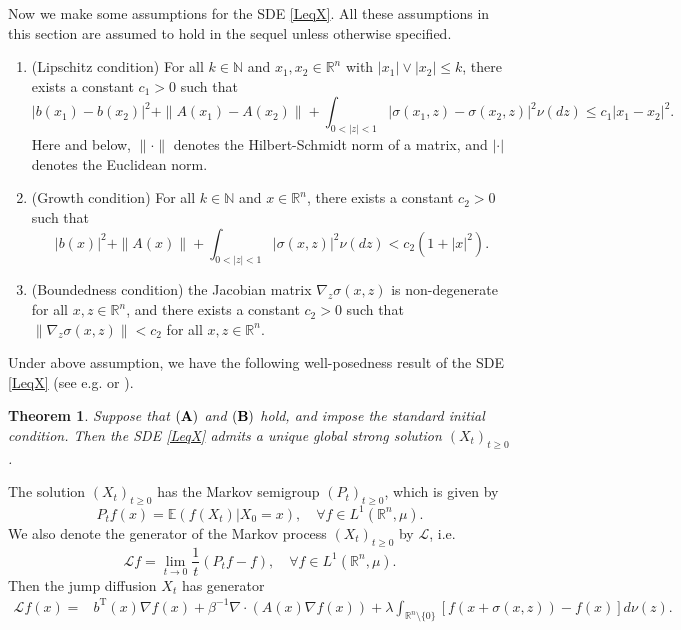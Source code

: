 \documentclass[10pt]{article}
\newtheorem{thm}{Theorem}[section]
\theoremstyle{definition}
\numberwithin{equation}{section}
\begin{document}
Now we make some assumptions for the SDE \eqref{LeqX}. All these assumptions in this section are assumed to hold in the sequel unless otherwise specified.
\begin{enumerate}
    \item[({\bf A})](Lipschitz condition) For all $k \in \mathbb{N}$ and $ x_{1}, x_{2} \in  \mathbb{R}^n$ with $|x_1| \vee |x_2| \leq k$, there exists a constant  $c_1 >0$ such that
\begin{equation*}
     |b(x_1) - b(x_2)|^2+\|A(x_1)- A(x_2)\| + \int_{0 <|z| <1} |\sigma(x_1,z) - \sigma(x_2,z)|^2 \nu (dz) \leq c_1 |x_1-x_2|^{2}.
\end{equation*}
Here and below, $\|\cdot\|$ denotes the Hilbert-Schmidt norm of a matrix, and $|\cdot|$ denotes the Euclidean norm.
    \item[({\bf B})] (Growth condition) For all $k \in \mathbb{N}$ and $ x\in  \mathbb{R}^n$, there exists a constant  $c_2 >0$ such that
\begin{equation*}
 |b(x)|^2 + \|A(x)\| + \int_{0 <|z| <1} |\sigma(x,z)|^2 \nu (dz) < c_2(1 + |x|^2).
\end{equation*}
    \item[({\bf C})] (Boundedness condition) the Jacobian matrix $\nabla_z \sigma(x,z)$ is non-degenerate for all $x,z \in \mathbb{R}^n$, and there exists a constant $c_2>0$ such that $\|\nabla_z \sigma(x,z)\| < c_2$ for all $x,z \in \mathbb{R}^n$.
\end{enumerate} 

Under above assumption, we have the following well-posedness result of the SDE \eqref{LeqX} (see e.g. \cite[Theorem 6.2.9]{A2004} or \cite[Theorem 3.3.1]{K19}).

\begin{thm}\label{ExD}
Suppose that $({\bf A})$ and $({\bf B})$ hold, and impose the standard initial condition. Then the SDE \eqref{LeqX} admits a unique global strong solution $(X_t)_{t\geq 0}$.
\end{thm}

The solution $(X_t)_{t\geq 0}$ has the Markov semigroup $(P_t)_{t\geq 0}$, which is given by
\begin{equation*}
    P_t f(x)=\mathbb{E}(f(X_t)|X_0 =x), \quad \forall f \in L^1(\mathbb{R}^n, \mu).
\end{equation*}
We also denote the generator of the Markov process $(X_t)_{t\geq 0}$ by $\mathcal{L}$, i.e.
\begin{equation*}
    \mathcal{L}f = \lim_{t \rightarrow 0} \frac{1}{t}(P_t f - f),\quad \forall f \in L^1(\mathbb{R}^n, \mu).
\end{equation*}
Then the jump diffusion $X_t$ has generator
\begin{align*}
    \mathcal{L}f(x) = & b^\mathrm{T}(x) \nabla f(x) + \beta^{-1} \nabla\cdot (A(x)\nabla f(x)) + \lambda\int_{\mathbb{R}^n \setminus \{ 0 \} } \left[ f(x+ \sigma(x,z)) - f(x)\right] d\nu(z).
\end{align*}
\end{document}
